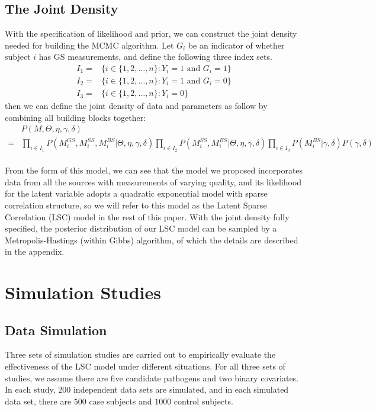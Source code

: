 \documentclass[11 pt, a4paper]{article}  %
\begin{document}
\subsection{The Joint Density}
With the specification of likelihood and prior, we can construct the joint density needed for building the MCMC algorithm. Let $G_i$ be an indicator of whether subject $i$ has GS measurements, and define the following three index sets.
\begin{align*}
I_1 = & \Big \{i \in \{1,2,\ldots, n\}: Y_i=1 \text{ and } G_i=1 \Big\}\\
I_2 = & \Big \{i \in \{1,2,\ldots, n\}: Y_i=1 \text{ and } G_i=0 \Big\}\\
I_3 = & \Big \{i \in \{1,2,\ldots, n\}: Y_i=0 \Big\}
\end{align*}
then we can define the joint density of data and parameters as follow by combining all building blocks together:
\begin{align*}
& P(M,\Theta, \eta, \gamma, \delta) \\
= & \prod_{i\in I_1} P(M_i^{GS},M_i^{SS},M_i^{BS} | \Theta, \eta, \gamma, \delta) 
\prod_{i\in I_2} P(M_i^{SS},M_i^{BS} |\Theta, \eta, \gamma, \delta)
\prod_{i\in I_3} P(M_i^{BS} |\gamma, \delta) P(\gamma, \delta)
\end{align*}
\\
From the form of this model, we can see that the model we proposed incorporates data from all the sources with measurements of varying quality, and its likelihood for the latent variable adopts a quadratic exponential model with sparse correlation structure, so we will refer to this model as the Latent Sparse Correlation (LSC) model in the rest of this paper. With the joint density fully specified, the posterior distribution of our LSC model can be sampled by a Metropolis-Hastings (within Gibbs) algorithm, of which the details are described in the appendix.


\newpage
\section{Simulation Studies}
\subsection{Data Simulation}
Three sets of simulation studies are carried out to empirically evaluate the effectiveness of the LSC model under different situations. For all three sets of studies, we assume there are five candidate pathogens and two binary covariates. In each study, $200$ independent data sets are simulated, and in each simulated data set, there are $500$ case subjects and $1000$ control subjects.\\
\end{document}
